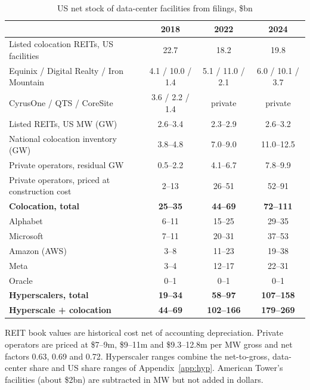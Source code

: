 \documentclass[11pt]{article}
\newcommand{\bn}{\$bn}
\begin{document}
\begin{table}[ht]
\centering
\begin{threeparttable}
\caption{US net stock of data-center facilities from filings, \bn}
\label{tab:filings}
\small
\begin{tabular}{lccc}
\toprule
 & 2018 & 2022 & 2024 \\
\midrule
Listed colocation REITs, US facilities & 22.7 & 18.2 & 19.8 \\
\quad Equinix / Digital Realty / Iron Mountain & 4.1 / 10.0 / 1.4 & 5.1 / 11.0 / 2.1 & 6.0 / 10.1 / 3.7 \\
\quad CyrusOne / QTS / CoreSite & 3.6 / 2.2 / 1.4 & private & private \\
Listed REITs, US MW (GW) & 2.6--3.4 & 2.3--2.9 & 2.6--3.2 \\
National colocation inventory (GW) & 3.8--4.8 & 7.0--9.0 & 11.0--12.5 \\
Private operators, residual GW & 0.5--2.2 & 4.1--6.7 & 7.8--9.9 \\
Private operators, priced at construction cost & 2--13 & 26--51 & 52--91 \\
\textbf{Colocation, total} & \textbf{25--35} & \textbf{44--69} & \textbf{72--111} \\
\midrule
Alphabet & 6--11 & 15--25 & 29--35 \\
Microsoft & 7--11 & 20--31 & 37--53 \\
Amazon (AWS) & 3--8 & 11--23 & 19--38 \\
Meta & 3--4 & 12--17 & 22--31 \\
Oracle & 0--1 & 0--1 & 0--1 \\
\textbf{Hyperscalers, total} & \textbf{19--34} & \textbf{58--97} & \textbf{107--158} \\
\midrule
\textbf{Hyperscale + colocation} & \textbf{44--69} & \textbf{102--166} & \textbf{179--269} \\
\bottomrule
\end{tabular}
\begin{tablenotes}\footnotesize
\item REIT book values are historical cost net of accounting depreciation. Private operators are priced at \$7--9m, \$9--11m and \$9.3--12.8m per MW gross and net factors 0.63, 0.69 and 0.72. Hyperscaler ranges combine the net-to-gross, data-center share and US share ranges of Appendix~\ref{app:hyp}. American Tower's facilities (about \$2bn) are subtracted in MW but not added in dollars.
\end{tablenotes}
\end{threeparttable}
\end{table}
\end{document}
